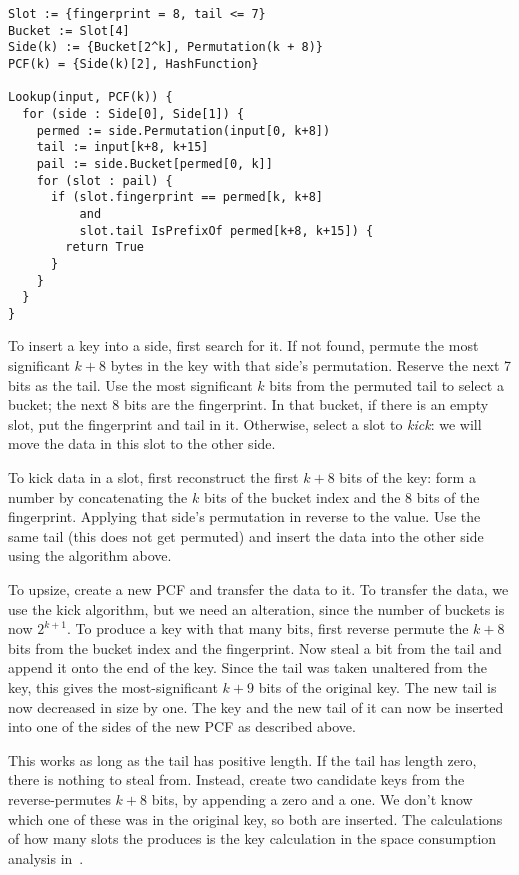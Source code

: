\documentclass[letterpaper, 11pt]{article}
\begin{document}
\begin{verbatim}
Slot := {fingerprint = 8, tail <= 7}
Bucket := Slot[4]
Side(k) := {Bucket[2^k], Permutation(k + 8)}
PCF(k) = {Side(k)[2], HashFunction}

Lookup(input, PCF(k)) {
  for (side : Side[0], Side[1]) {
    permed := side.Permutation(input[0, k+8])
    tail := input[k+8, k+15]
    pail := side.Bucket[permed[0, k]]
    for (slot : pail) {
      if (slot.fingerprint == permed[k, k+8]
          and
          slot.tail IsPrefixOf permed[k+8, k+15]) {
        return True
      }
    }
  }
}
\end{verbatim}

To insert a key into a side, first search for it.
If not found, permute the most significant $k+8$ bytes in the key with that side's permutation.
Reserve the next 7 bits as the tail.
Use the most significant $k$ bits from the permuted tail to select a bucket; the next 8 bits are the fingerprint.
In that bucket, if there is an empty slot, put the fingerprint and tail in it.
Otherwise, select a slot to {\em kick}: we will move the data in this slot to the other side.

To kick data in a slot, first reconstruct the first $k + 8$ bits of the key:
form a number by concatenating the $k$ bits of the bucket index and the $8$ bits of the fingerprint.
Applying that side's permutation in reverse to the value.
Use the same tail (this does not get permuted) and insert the data into the other side using the algorithm above.

To upsize, create a new PCF and transfer the data to it.
To transfer the data, we use the kick algorithm, but we need an alteration, since the number of buckets is now $2^{k+1}$.
To produce a key with that many bits, first reverse permute the $k+8$ bits from the bucket index and the fingerprint.
Now steal a bit from the tail and append it onto the end of the key.
Since the tail was taken unaltered from the key, this gives the most-significant $k+9$ bits of the original key.
The new tail is now decreased in size by one.
The key and the new tail of it can now be inserted into one of the sides of the new PCF as described above.

This works as long as the tail has positive length.
If the tail has length zero, there is nothing to steal from.
Instead, create two candidate keys from the reverse-permutes $k+8$ bits, by appending a zero and a one.
We don't know which one of these was in the original key, so both are inserted.
The calculations of how many slots the produces is the key calculation in the space consumption analysis in~\cite{psw}.
\end{document}
